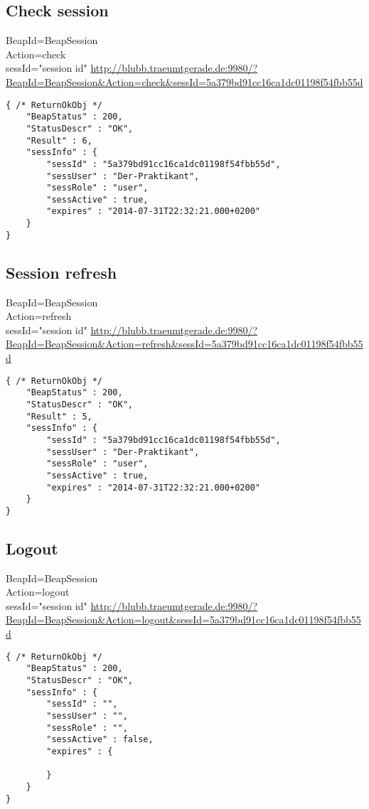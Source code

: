 \documentclass[12pt,a4paper,oneside]{report}
\begin{document}
\subsection{Check session}
BeapId=BeapSession\\
Action=check\\
sessId="session id"
\url{http://blubb.traeumtgerade.de:9980/?BeapId=BeapSession&Action=check&sessId=5a379bd91cc16ca1dc01198f54fbb55d}
\lstset{language=JavaScript}
\begin{lstlisting}
{ /* ReturnOkObj */
    "BeapStatus" : 200,
    "StatusDescr" : "OK",
    "Result" : 6,
    "sessInfo" : { 
        "sessId" : "5a379bd91cc16ca1dc01198f54fbb55d",
        "sessUser" : "Der-Praktikant",
        "sessRole" : "user",
        "sessActive" : true,
        "expires" : "2014-07-31T22:32:21.000+0200"
    }
}
\end{lstlisting}

\subsection{Session refresh}

BeapId=BeapSession\\
Action=refresh\\
sessId="session id"
\url{http://blubb.traeumtgerade.de:9980/?BeapId=BeapSession&Action=refresh&sessId=5a379bd91cc16ca1dc01198f54fbb55d}
\lstset{language=JavaScript}
\begin{lstlisting}
{ /* ReturnOkObj */
    "BeapStatus" : 200,
    "StatusDescr" : "OK",
    "Result" : 5,
    "sessInfo" : { 
        "sessId" : "5a379bd91cc16ca1dc01198f54fbb55d",
        "sessUser" : "Der-Praktikant",
        "sessRole" : "user",
        "sessActive" : true,
        "expires" : "2014-07-31T22:32:21.000+0200"
    }
}
\end{lstlisting}

\subsection{Logout}

BeapId=BeapSession\\
Action=logout\\
sessId="session id"
\url{http://blubb.traeumtgerade.de:9980/?BeapId=BeapSession&Action=logout&sessId=5a379bd91cc16ca1dc01198f54fbb55d}
\lstset{language=JavaScript}
\begin{lstlisting}
{ /* ReturnOkObj */
    "BeapStatus" : 200,
    "StatusDescr" : "OK",
    "sessInfo" : { 
        "sessId" : "",
        "sessUser" : "",
        "sessRole" : "",
        "sessActive" : false,
        "expires" : { 

        }
    }
}
\end{lstlisting}
\end{document}
